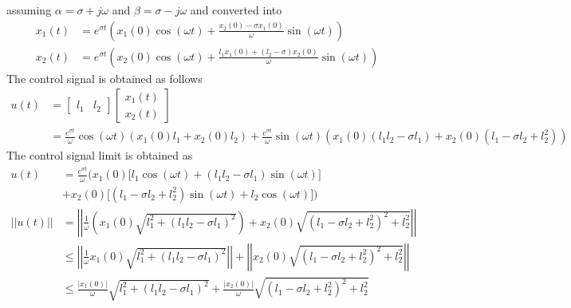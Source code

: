 assuming $\alpha=\sigma+j\omega$ and $\beta=\sigma-j\omega$ and converted into 
\begin{equation}
\begin{split}
x_1(t)&=e^{\sigma t}\left(x_1(0)\cos{(\omega t)}+\frac{x_2(0)-\sigma x_1(0)}{\omega}\sin{(\omega t)}\right)\\
x_2(t)&=e^{\sigma t}\left(x_2(0)\cos{(\omega t)}+\frac{l_1x_1(0)+(l_2-\sigma) x_2(0)}{\omega}\sin{(\omega t)}\right)
\end{split}
\end{equation}
The control signal is obtained as follows
\begin{equation}
    \begin{split}
    u(t)&=\begin{bmatrix}l_1&l_2\end{bmatrix}\begin{bmatrix}x_1(t)\\x_2(t)\end{bmatrix}\\
    &=\frac{e^{\sigma t}}{\omega}\cos{(\omega t)}\left(
        x_1(0)l_1+x_2(0)l_2
    \right)+
    \frac{e^{\sigma t}}{\omega}\sin{(\omega t)}\left(
        x_1(0)(l_1l_2-\sigma l_1)+x_2(0)(l_1-\sigma l_2+l_2^2)
    \right)
    \end{split}
\end{equation}
The control signal limit is obtained as
\begin{equation}
    \begin{split}
    u(t)&=\frac{e^{\sigma t}}{\omega}\Big(
        x_1(0)\Big[
            l_1\cos{(\omega t)}+(l_1l_2-\sigma l_1)\sin{(\omega t)}\Big]\\
        &+x_2(0)\Big[
        (l_1-\sigma l_2+l_2^2)\sin{(\omega t)}+l_2\cos{(\omega t)}
        \Big]
    \Big)\\
    ||u(t)||&=\left|\left|\frac{1}{\omega}(x_1(0)\sqrt{l_1^2+(l_1l_2-\sigma l_1)^2})
    +x_2(0)\sqrt{(l_1-\sigma l_2+l_2^2)^2+l_2^2}\right|\right|\\
    &\leq \left|\left|\frac{1}{\omega}x_1(0)\sqrt{l_1^2+(l_1l_2-\sigma l_1)^2}\right|\right|+\left|\left|x_2(0)\sqrt{(l_1-\sigma l_2+l_2^2)^2+l_2^2}\right|\right|\\
    &\leq \frac{|x_1(0)|}{\omega}\sqrt{l_1^2+(l_1l_2-\sigma l_1)^2}+\frac{|x_2(0)|}{\omega}\sqrt{(l_1-\sigma l_2+l_2^2)^2+l_2^2}\\
    \end{split}
\end{equation}

